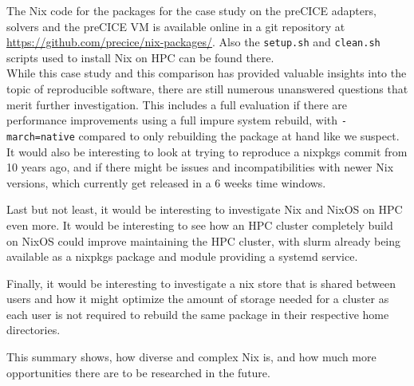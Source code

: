 \documentclass{eceasst}
\begin{document}
The Nix code for the packages for the case study on the preCICE adapters, solvers and the preCICE VM is available online in a git repository at \url{https://github.com/precice/nix-packages/}.
Also the \texttt{setup.sh} and \texttt{clean.sh} scripts used to install Nix on HPC can be found there.\\


While this case study and this comparison has provided valuable insights into the topic of reproducible software, there are still numerous unanswered questions that merit further investigation.
This includes a full evaluation if there are performance improvements using a full impure system rebuild, with \texttt{-march=native} compared to only rebuilding the package at hand like we suspect.
It would also be interesting to look at trying to reproduce a nixpkgs commit from 10 years ago, and if there might be issues and incompatibilities with newer Nix versions, which currently get released in a 6 weeks time windows.

Last but not least, it would be interesting to investigate Nix and NixOS on HPC even more.
It would be interesting to see how an HPC cluster completely build on NixOS could improve maintaining the HPC cluster, with slurm already being available as a nixpkgs package and module providing a systemd service.

Finally, it would be interesting to investigate a nix store that is shared between users and how it might optimize the amount of storage needed for a cluster as each user is not required to rebuild the same package in their respective home directories.

This summary shows, how diverse and complex Nix is, and how much more opportunities there are to be researched in the future.

\nocite{*}


\end{document}
